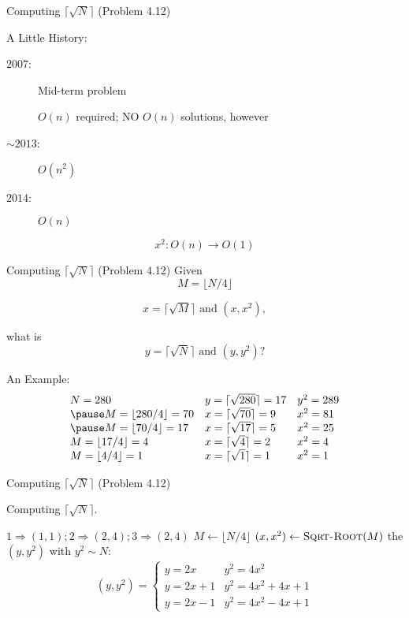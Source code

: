 \begin{frame}{Computing $\lceil \sqrt{N} \rceil$ (Problem 4.12)}
  \begin{block}{A Little History:}
    \begin{description}
	  \item[$2007$:] Mid-term problem \\
		\centerline{$O(n)$ required; NO $O(n)$ solutions, however}
	  \item[$\sim 2013$:] $O(n^2)$
	  \pause
	  \item[$2014$:] $O(n)$
    \end{description}
  \end{block}

  \pause
  \[
	x^2: O(n) \to O(1)
  \]
\end{frame}
\begin{frame}{Computing $\lceil \sqrt{N} \rceil$ (Problem 4.12)}
  Given
  \[
	M = \lfloor N/4 \rfloor
  \]

  \[ 
	x = \lceil \sqrt{M} \rceil \textrm{ and } (x, x^2),
  \]

  what is
  \[ 
    y = \lceil \sqrt{N} \rceil \textrm{ and } (y, y^2)? 
  \]

  \pause
  \begin{exampleblock}{An Example:}
  \[
	\begin{array}{lll}
	  N = 280 & y = \lceil \sqrt{280} \rceil = 17 & y^2 = 289 \\ \pause
	  M = \lfloor 280/4 \rfloor = 70 & x = \lceil \sqrt{70} \rceil = 9 & x^2 = 81 \\ \pause
	  M = \lfloor 70/4 \rfloor = 17 & x = \lceil \sqrt{17} \rceil = 5 & x^2 = 25 \\
	  M = \lfloor 17/4 \rfloor = 4 & x = \lceil \sqrt{4} \rceil = 2 & x^2 = 4 \\
	  M = \lfloor 4/4 \rfloor = 1 & x = \lceil \sqrt{1} \rceil = 1 & x^2 = 1
	\end{array}
  \]
  \end{exampleblock}
\end{frame}
\begin{frame}{Computing $\lceil \sqrt{N} \rceil$ (Problem 4.12)}
  \begin{algorithm}[H]
    \caption{Computing $\lceil \sqrt{N} \rceil$.}
    \begin{algorithmic}[]
	      \State \Return $1 \Rightarrow (1,1); 2 \Rightarrow (2,4); 3 \Rightarrow (2,4)$
	    \EndIf
	    \State $M \gets \lfloor N/4 \rfloor$
	    \State $(x, x^2) \gets \textsc{Sqrt-Root}{(M)}$
		\State \Return the $(y, y^2)$ with $y^2 \sim N$:
           \[
			(y, y^2) = \left\{ \begin{array}{ll}
			y = 2x & y^2 = 4x^2 \\
			y = 2x + 1 & y^2 = 4x^2 + 4x + 1 \\
			y = 2x - 1 & y^2 = 4x^2 - 4x + 1
			\end{array} \right.
	      \]
	  \EndProcedure
    \end{algorithmic}
  \end{algorithm}
\end{frame}
